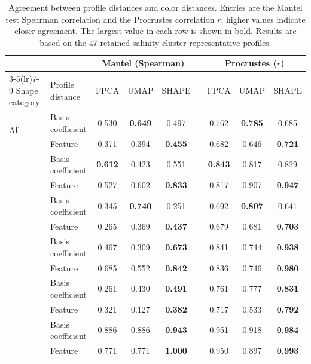 \documentclass[11pt]{article}
\theoremstyle{plain}
\begin{document}
\begin{table}[t]
\caption{Agreement between profile distances and color distances. Entries are
the Mantel test Spearman correlation and the Procrustes correlation $r$; higher
values indicate closer agreement. The largest value in each row is shown in
bold. Results are based on the 47 retained salinity cluster-representative
profiles.}
\label{tab:color-validation}
\centering
\small
\begin{tabular}{llccccccc}
\toprule
 & & \multicolumn{3}{c}{Mantel (Spearman)} & & \multicolumn{3}{c}{Procrustes ($r$)} \\
\cmidrule(lr){3-5}\cmidrule(lr){7-9}
Shape category & Profile distance & FPCA & UMAP & SHAPE & & FPCA & UMAP & SHAPE \\
\midrule
\multirow{2}{*}{All}
  & Basis coefficient & 0.530 & \textbf{0.649} & 0.497 & & 0.762 & \textbf{0.785} & 0.685 \\
  & Feature           & 0.371 & 0.394 & \textbf{0.455} & & 0.682 & 0.646 & \textbf{0.721} \\
\addlinespace
\multirow{2}{*}{C2}
  & Basis coefficient & \textbf{0.612} & 0.423 & 0.551 & & \textbf{0.843} & 0.817 & 0.829 \\
  & Feature           & 0.527 & 0.602 & \textbf{0.833} & & 0.817 & 0.907 & \textbf{0.947} \\
\addlinespace
\multirow{2}{*}{C3}
  & Basis coefficient & 0.345 & \textbf{0.740} & 0.251 & & 0.692 & \textbf{0.807} & 0.641 \\
  & Feature           & 0.265 & 0.369 & \textbf{0.437} & & 0.679 & 0.681 & \textbf{0.703} \\
\addlinespace
\multirow{2}{*}{C4}
  & Basis coefficient & 0.467 & 0.309 & \textbf{0.673} & & 0.841 & 0.744 & \textbf{0.938} \\
  & Feature           & 0.685 & 0.552 & \textbf{0.842} & & 0.836 & 0.746 & \textbf{0.980} \\
\addlinespace
\multirow{2}{*}{C5}
  & Basis coefficient & 0.261 & 0.430 & \textbf{0.491} & & 0.761 & 0.777 & \textbf{0.831} \\
  & Feature           & 0.321 & 0.127 & \textbf{0.382} & & 0.717 & 0.533 & \textbf{0.792} \\
\addlinespace
\multirow{2}{*}{C7}
  & Basis coefficient & 0.886 & 0.886 & \textbf{0.943} & & 0.951 & 0.918 & \textbf{0.984} \\
  & Feature           & 0.771 & 0.771 & \textbf{1.000} & & 0.950 & 0.897 & \textbf{0.993} \\
\bottomrule
\end{tabular}
\end{table}
\end{document}
